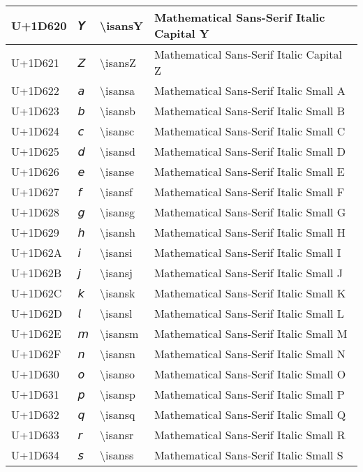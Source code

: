 \begin{table}[h]
\begin{tabulary}{\linewidth}{|L|L|L|L|}
\hline
U+1D620 & 𝘠 & {\textbackslash}isansY & Mathematical Sans-Serif Italic Capital Y \\
\hline
U+1D621 & 𝘡 & {\textbackslash}isansZ & Mathematical Sans-Serif Italic Capital Z \\
\hline
U+1D622 & 𝘢 & {\textbackslash}isansa & Mathematical Sans-Serif Italic Small A \\
\hline
U+1D623 & 𝘣 & {\textbackslash}isansb & Mathematical Sans-Serif Italic Small B \\
\hline
U+1D624 & 𝘤 & {\textbackslash}isansc & Mathematical Sans-Serif Italic Small C \\
\hline
U+1D625 & 𝘥 & {\textbackslash}isansd & Mathematical Sans-Serif Italic Small D \\
\hline
U+1D626 & 𝘦 & {\textbackslash}isanse & Mathematical Sans-Serif Italic Small E \\
\hline
U+1D627 & 𝘧 & {\textbackslash}isansf & Mathematical Sans-Serif Italic Small F \\
\hline
U+1D628 & 𝘨 & {\textbackslash}isansg & Mathematical Sans-Serif Italic Small G \\
\hline
U+1D629 & 𝘩 & {\textbackslash}isansh & Mathematical Sans-Serif Italic Small H \\
\hline
U+1D62A & 𝘪 & {\textbackslash}isansi & Mathematical Sans-Serif Italic Small I \\
\hline
U+1D62B & 𝘫 & {\textbackslash}isansj & Mathematical Sans-Serif Italic Small J \\
\hline
U+1D62C & 𝘬 & {\textbackslash}isansk & Mathematical Sans-Serif Italic Small K \\
\hline
U+1D62D & 𝘭 & {\textbackslash}isansl & Mathematical Sans-Serif Italic Small L \\
\hline
U+1D62E & 𝘮 & {\textbackslash}isansm & Mathematical Sans-Serif Italic Small M \\
\hline
U+1D62F & 𝘯 & {\textbackslash}isansn & Mathematical Sans-Serif Italic Small N \\
\hline
U+1D630 & 𝘰 & {\textbackslash}isanso & Mathematical Sans-Serif Italic Small O \\
\hline
U+1D631 & 𝘱 & {\textbackslash}isansp & Mathematical Sans-Serif Italic Small P \\
\hline
U+1D632 & 𝘲 & {\textbackslash}isansq & Mathematical Sans-Serif Italic Small Q \\
\hline
U+1D633 & 𝘳 & {\textbackslash}isansr & Mathematical Sans-Serif Italic Small R \\
\hline
U+1D634 & 𝘴 & {\textbackslash}isanss & Mathematical Sans-Serif Italic Small S \\

\end{tabulary}
\end{table}
